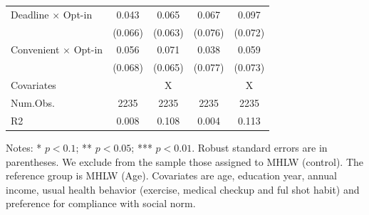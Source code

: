 \documentclass[
]{article}
\begin{document}
\begin{table}
\begin{threeparttable}
\begin{tabular}[t]{lcccc}
Deadline $\times$ Opt-in & \num{0.043} & \num{0.065} & \num{0.067} & \num{0.097}\\
 & (\num{0.066}) & (\num{0.063}) & (\num{0.076}) & (\num{0.072})\\
Convenient $\times$ Opt-in & \num{0.056} & \num{0.071} & \num{0.038} & \num{0.059}\\
 & (\num{0.068}) & (\num{0.065}) & (\num{0.077}) & (\num{0.073})\\
\midrule
Covariates &  & X &  & X\\
Num.Obs. & \num{2235} & \num{2235} & \num{2235} & \num{2235}\\
R2 & \num{0.008} & \num{0.108} & \num{0.004} & \num{0.113}\\
\bottomrule
\end{tabular}
\begin{tablenotes}
\item Notes: * $p < 0.1$; ** $p < 0.05$; *** $p < 0.01$. Robust standard errors are in parentheses. We exclude from the sample those assigned to MHLW (control). The reference group is MHLW (Age). Covariates are age, education year, annual income, usual health behavior (exercise, medical checkup and ful shot habit) and preference for compliance with social norm.
\end{tablenotes}
\end{threeparttable}
\end{table}
\end{document}

